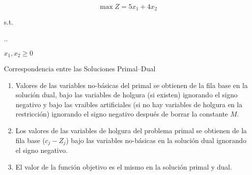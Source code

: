 \begin{frameExample}{}{}
  \[ \max Z = 5x_1 + 4x_2 \]
      {\centering
      s.t.%
\vspace{4mm}
      
        \sysdelim..%

      \vspace{5mm}
      $x_1, x_2 \geq 0$
      \par}
\end{frameExample}
  
\begin{frame}{Correspondencia entre las Soluciones Primal--Dual}

  \begin{enumerate} \justifying \parskip3mm
  \item Valores de las variables no-básicas del primal se obtienen de la fila base en la solución dual, bajo las variables de holgura (si existen) ignorando el signo negativo y bajo las vraibles artificiales (si no hay variables de holgura en la restricción) ignorando el signo negativo después de borrar la constante $M$.
  \item Los valores de las variables de holgura del problema primal se obtienen de la fila base ($c_j - Z_j$) bajo las variables no-básicas en la solución dual ignorando el signo negativo.
  \item El valor de la función objetivo es el mismo en la solución primal y dual.
  \end{enumerate}
\end{frame}




